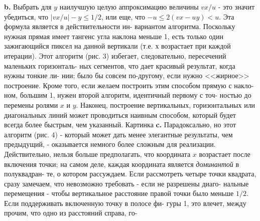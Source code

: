\documentclass{mai_book}
\begin{document}
\hspace*{15pt}\textbf{b.} Выбрать для $y$ наилучшую целую аппроксимацию величины $vx/u$
- это значит убедиться, что $|vx/u|-y\leq 1/2$, или еще, что
$-u\leq2(vx-uy)<u$. Эта формула является в действительности ин-
вариантом алгоритма. Поскольку нужная прямая имеет тангенс угла
наклона меньше 1, есть только один зажигающийся пиксел на данной
вертикали (т.е. $х$ возрастает при каждой итерации). Этот алгоритм
(рис. 3) избегает, следовательно, пересечений маленьких горизонталь-
ных сегментов, что дает красивый результат, когда нужны тонкие ли-
нии; было бы совсем по-другому, если нужно <<жирное>> построение.\newline
\hspace*{15pt}Кроме того, если желаем построить этим способом прямую с накло-
ном, большим 1, нужен второй алгоритм, идентичный первому с точ-
ностью до перемены ролями $x$ и $y$. Наконец, построение вертикальных,
горизонтальных или диагональных линий может проводиться наивным
способом, который будет всегда более быстрым, чем указанный.
Картинка\newline
\hspace*{15pt}\textbf{c.} Парадоксально, но этот алгоритм (рис. 4) - который может
дать менее элегантные результаты, чем предыдущий, - оказывается
немного более сложным для реализации. Действительно, нельзя больше
предполагать, что координата $x$ возрастает после включения точки; на
самом деле, каждая координата является \textit{доминантой} в полуквадран-
те, о котором рассуждаем. Если рассмотреть четыре точки квадрата,
сразу замечаем, что невозможно требовать - если не разрешены диаго-
нальные перемещения - чтобы вертикальное расстояние правой точки
было меньше $1/2$. Если поддерживать включенную точку в полосе фи-
гуры 1, это влечет, между прочим, что одно из расстояний справа, го-
\newpage
\end{document}
